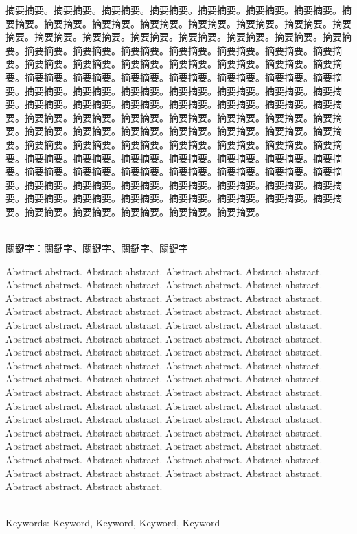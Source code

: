 
\begin{abstractzh}

摘要摘要。摘要摘要。摘要摘要。摘要摘要。摘要摘要。摘要摘要。摘要摘要。摘要摘要。摘要摘要。摘要摘要。摘要摘要。摘要摘要。摘要摘要。摘要摘要。摘要摘要。摘要摘要。摘要摘要。摘要摘要。摘要摘要。摘要摘要。摘要摘要。摘要摘要。摘要摘要。摘要摘要。摘要摘要。摘要摘要。摘要摘要。摘要摘要。摘要摘要。摘要摘要。摘要摘要。摘要摘要。摘要摘要。摘要摘要。摘要摘要。摘要摘要。摘要摘要。摘要摘要。摘要摘要。摘要摘要。摘要摘要。摘要摘要。摘要摘要。摘要摘要。摘要摘要。摘要摘要。摘要摘要。摘要摘要。摘要摘要。摘要摘要。摘要摘要。摘要摘要。摘要摘要。摘要摘要。摘要摘要。摘要摘要。摘要摘要。摘要摘要。摘要摘要。摘要摘要。摘要摘要。摘要摘要。摘要摘要。摘要摘要。摘要摘要。摘要摘要。摘要摘要。摘要摘要。摘要摘要。摘要摘要。摘要摘要。摘要摘要。摘要摘要。摘要摘要。摘要摘要。摘要摘要。摘要摘要。摘要摘要。摘要摘要。摘要摘要。摘要摘要。摘要摘要。摘要摘要。摘要摘要。摘要摘要。摘要摘要。摘要摘要。摘要摘要。摘要摘要。摘要摘要。摘要摘要。摘要摘要。摘要摘要。摘要摘要。摘要摘要。摘要摘要。摘要摘要。摘要摘要。摘要摘要。摘要摘要。摘要摘要。摘要摘要。摘要摘要。摘要摘要。摘要摘要。摘要摘要。摘要摘要。摘要摘要。摘要摘要。摘要摘要。摘要摘要。

~\\
\noindent
關鍵字：關鍵字、關鍵字、關鍵字、關鍵字
\end{abstractzh}

\begin{abstracten}
\begin{small}
Abstract abstract. Abstract abstract. Abstract abstract. Abstract abstract. Abstract abstract. Abstract abstract. Abstract abstract. Abstract abstract. Abstract abstract. Abstract abstract. Abstract abstract. Abstract abstract. Abstract abstract. Abstract abstract. Abstract abstract. Abstract abstract. Abstract abstract. Abstract abstract. Abstract abstract. Abstract abstract. Abstract abstract. Abstract abstract. Abstract abstract. Abstract abstract. Abstract abstract. Abstract abstract. Abstract abstract. Abstract abstract. Abstract abstract. Abstract abstract. Abstract abstract. Abstract abstract. Abstract abstract. Abstract abstract. Abstract abstract. Abstract abstract. Abstract abstract. Abstract abstract. Abstract abstract. Abstract abstract. Abstract abstract. Abstract abstract. Abstract abstract. Abstract abstract. Abstract abstract. Abstract abstract. Abstract abstract. Abstract abstract. Abstract abstract. Abstract abstract. Abstract abstract. Abstract abstract. Abstract abstract. Abstract abstract. Abstract abstract. Abstract abstract. Abstract abstract. Abstract abstract. Abstract abstract. Abstract abstract. Abstract abstract. Abstract abstract. Abstract abstract. Abstract abstract. Abstract abstract. Abstract abstract.


~\\
\noindent
Keywords: Keyword, Keyword, Keyword, Keyword
\end{small}
\end{abstracten}
